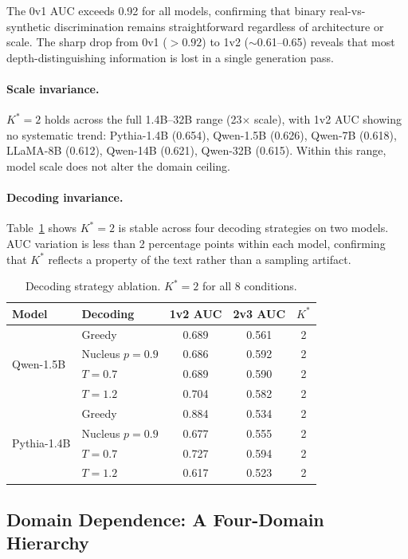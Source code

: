 \documentclass[11pt,a4paper]{article}
\begin{document}
The 0v1 AUC exceeds 0.92 for all models, confirming that binary real-vs-synthetic discrimination remains straightforward regardless of architecture or scale. The sharp drop from 0v1 ($>0.92$) to 1v2 ($\sim$0.61--0.65) reveals that most depth-distinguishing information is lost in a single generation pass.

\paragraph{Scale invariance.} $K^*\!=\!2$ holds across the full 1.4B--32B range (23$\times$ scale), with 1v2 AUC showing no systematic trend: Pythia-1.4B (0.654), Qwen-1.5B (0.626), Qwen-7B (0.618), LLaMA-8B (0.612), Qwen-14B (0.621), Qwen-32B (0.615). Within this range, model scale does not alter the domain ceiling.

\paragraph{Decoding invariance.} Table~\ref{tab:decoding} shows $K^*\!=\!2$ is stable across four decoding strategies on two models. AUC variation is less than 2 percentage points within each model, confirming that $K^*$ reflects a property of the text rather than a sampling artifact.

\begin{table}[t]
\centering
\small
\caption{Decoding strategy ablation. $K^*\!=\!2$ for all 8 conditions.}
\label{tab:decoding}
\begin{tabular}{llccc}
\toprule
Model & Decoding & 1v2 AUC & 2v3 AUC & $K^*$ \\
\midrule
\multirow{4}{*}{Qwen-1.5B} & Greedy & 0.689 & 0.561 & 2 \\
 & Nucleus $p\!=\!0.9$ & 0.686 & 0.592 & 2 \\
 & $T\!=\!0.7$ & 0.689 & 0.590 & 2 \\
 & $T\!=\!1.2$ & 0.704 & 0.582 & 2 \\
\midrule
\multirow{4}{*}{Pythia-1.4B} & Greedy & 0.884 & 0.534 & 2 \\
 & Nucleus $p\!=\!0.9$ & 0.677 & 0.555 & 2 \\
 & $T\!=\!0.7$ & 0.727 & 0.594 & 2 \\
 & $T\!=\!1.2$ & 0.617 & 0.523 & 2 \\
\bottomrule
\end{tabular}
\end{table}


\subsection{Domain Dependence: A Four-Domain Hierarchy}\label{sec:domain}
\end{document}
